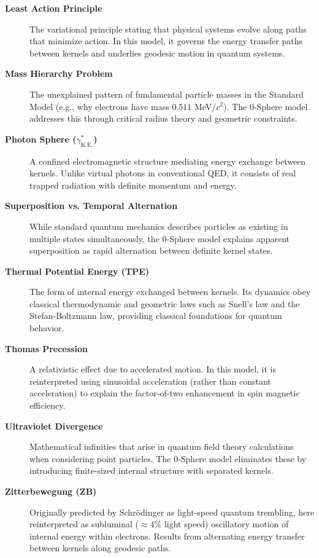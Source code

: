 \documentclass[%
 reprint,
 amsmath,amssymb,
 aps,
]{revtex4-1}
\numberwithin{equation}{section}%
\begin{document}
\begin{description}
  \item[\textbf{Least Action Principle}] The variational principle stating that physical systems evolve along paths that minimize action. In this model, it governs the energy transfer paths between kernels and underlies geodesic motion in quantum systems.
  
  \item[\textbf{Mass Hierarchy Problem}] The unexplained pattern of fundamental particle masses in the Standard Model (e.g., why electrons have mass $0.511$ MeV/$c^{2}$). The 0-Sphere model addresses this through critical radius theory and geometric constraints.
  
  \item[\textbf{Photon Sphere ($\gamma^*_{\mathrm{K.E.}}$)}] A confined electromagnetic structure mediating energy exchange between kernels. Unlike virtual photons in conventional QED, it consists of real trapped radiation with definite momentum and energy.
  
  \item[\textbf{Superposition vs. Temporal Alternation}] While standard quantum mechanics describes particles as existing in multiple states simultaneously, the 0-Sphere model explains apparent superposition as rapid alternation between definite kernel states.
  
  \item[\textbf{Thermal Potential Energy (TPE)}] The form of internal energy exchanged between kernels. Its dynamics obey classical thermodynamic and geometric laws such as Snell's law and the Stefan-Boltzmann law, providing classical foundations for quantum behavior.
  
  \item[\textbf{Thomas Precession}] A relativistic effect due to accelerated motion. In this model, it is reinterpreted using sinusoidal acceleration (rather than constant acceleration) to explain the factor-of-two enhancement in spin magnetic efficiency.
  
  \item[\textbf{Ultraviolet Divergence}] Mathematical infinities that arise in quantum field theory calculations when considering point particles. The 0-Sphere model eliminates these by introducing finite-sized internal structure with separated kernels.
  
  \item[\textbf{Zitterbewegung (ZB)}] Originally predicted by Schr\"{o}dinger as light-speed quantum trembling, here reinterpreted as subluminal ($\approx 4\%$ light speed) oscillatory motion of internal energy within electrons. Results from alternating energy transfer between kernels along geodesic paths.
\end{description}

\end{document}

